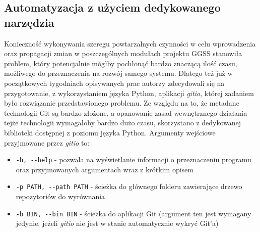 \subsection{Automatyzacja z użyciem dedykowanego narzędzia}
\label{subsec:gitio}
Konieczność wykonywania szeregu powtarzalnych czynności w celu wprowadzenia oraz propagacji zmian w poszczególnych modułach projektu GGSS stanowiła problem, który potencjalnie mógłby pochłonąć bardzo znaczącą ilość czasu, możliwego do przeznaczenia na rozwój samego systemu. Dlatego też już w początkowych tygodniach opisywanych prac autorzy zdecydowali się na przygotowanie, z wykorzystaniem języka Python, aplikacji \emph{gitio}, której zadaniem było rozwiązanie przedstawionego problemu. Ze względu na to, że metadane technologii Git są bardzo złożone, a opanowanie zasad wewnętrznego działania tejże technologii wymagałoby bardzo dużo czasu, skorzystano z dedykowanej biblioteki \cite{gitpython} dostępnej z poziomu języka Python. Argumenty wejściowe przyjmowane przez \emph{gitio} to:
\begin{itemize}
    \item \lstinline{-h, --help} - pozwala na wyświetlanie informacji o przeznaczeniu programu oraz przyjmowanych argumentach wraz z krótkim opisem
    \item \lstinline{-p PATH, --path PATH} - ścieżka do głównego folderu zawierające drzewo repozytoriów do wyrównania
    \item \lstinline{-b BIN, --bin BIN} - ścieżka do aplikacji Git (argument ten jest wymagany jedynie, jeżeli \emph{gitio} nie jest w stanie automatycznie wykryć Git'a)
\end{itemize}

